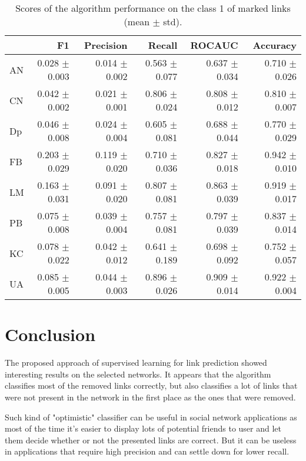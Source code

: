 \documentclass{llncs}
\begin{document}
%
\setlength{\tabcolsep}{5pt}
\renewcommand{\arraystretch}{1.5}
\begin{table}
\begin{center}
\caption{Scores of the algorithm performance on the class 1 of marked links (mean $\pm$ std).}
\begin{tabular}{l|rrrrr}
{} & F1 & Precision & Recall & ROCAUC & Accuracy  \\ \hline
AN & 0.028 $\pm$ 0.003 & 0.014 $\pm$ 0.002 & 0.563 $\pm$ 0.077 & 0.637 $\pm$ 0.034 & 0.710 $\pm$ 0.026  \\
CN & 0.042 $\pm$ 0.002 & 0.021 $\pm$ 0.001 & 0.806 $\pm$ 0.024 & 0.808 $\pm$ 0.012 & 0.810 $\pm$ 0.007  \\
Dp & 0.046 $\pm$ 0.008 & 0.024 $\pm$ 0.004 & 0.605 $\pm$ 0.081 & 0.688 $\pm$ 0.044 & 0.770 $\pm$ 0.029  \\ 
FB & 0.203 $\pm$ 0.029 & 0.119 $\pm$ 0.020 & 0.710 $\pm$ 0.036 & 0.827 $\pm$ 0.018 & 0.942 $\pm$ 0.010  \\
LM & 0.163 $\pm$ 0.031 & 0.091 $\pm$ 0.020 & 0.807 $\pm$ 0.081 & 0.863 $\pm$ 0.039 & 0.919 $\pm$ 0.017 \\ 
PB & 0.075 $\pm$ 0.008 & 0.039 $\pm$ 0.004 & 0.757 $\pm$ 0.081 & 0.797 $\pm$ 0.039 & 0.837 $\pm$ 0.014  \\
KC & 0.078 $\pm$ 0.022 & 0.042 $\pm$ 0.012 & 0.641 $\pm$ 0.189 & 0.698 $\pm$ 0.092 & 0.752 $\pm$  0.057 \\
UA & 0.085 $\pm$ 0.005 & 0.044 $\pm$ 0.003 & 0.896 $\pm$ 0.026 & 0.909 $\pm$ 0.014 & 0.922 $\pm$ 0.004  \\ 
\end{tabular}
\end{center}
\end{table}
%
\section{Conclusion}
%
The proposed approach of supervised learning for link prediction showed interesting results on the selected networks. It appears that the algorithm classifies most of the removed links correctly, but also classifies a lot of links that were not present in the network in the first place as the ones that were removed.

Such kind of "optimistic" classifier can be useful in social network applications as most of the time it's easier to display lots of potential friends to user and let them decide whether or not the presented links are correct. But it can be useless in applications that require high precision and can settle down for lower recall.
\end{document}
